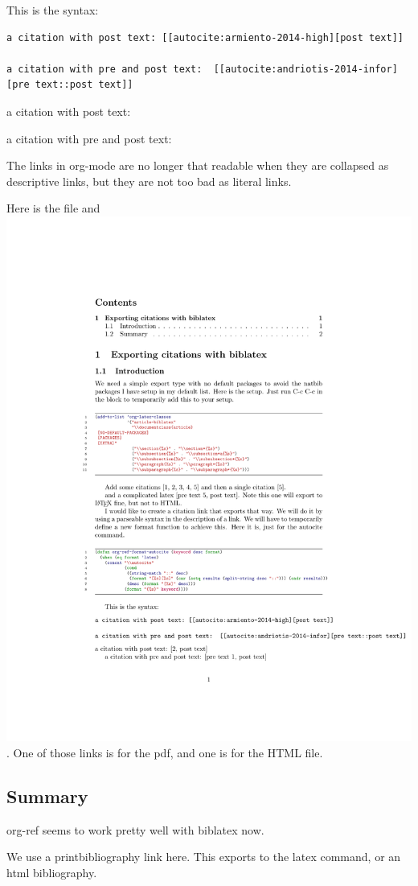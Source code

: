 \documentclass{article}
\begin{document}
This is the syntax:
\begin{verbatim}
a citation with post text: [[autocite:armiento-2014-high][post text]]

a citation with pre and post text:  [[autocite:andriotis-2014-infor][pre text::post text]]
\end{verbatim}
a citation with post text: \autocite[post text]{armiento-2014-high}

a citation with pre and post text:  \autocite[pre text][post text]{andriotis-2014-infor}

The links in org-mode are no longer that readable when they are collapsed as descriptive links, but they are not too bad as literal links. 

Here is the file  and \includegraphics[width=.9\linewidth]{exporting-with-biblatex.pdf}. One of those links is for the pdf, and one is for the HTML file.

\subsection{Summary}
\label{sec-1-2}
org-ref seems to work pretty well with biblatex now. 

We use a printbibliography link here. This exports to the latex command, or an html bibliography.
\printbibliography
\end{document}
